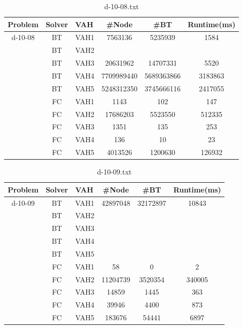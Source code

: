 \documentclass{article}
\begin{document}
\begin{table}[]
\caption{d-10-08.txt}
\label{tab:my-table}
\begin{tabular}{|c|c|c|c|c|c|}
\hline
Problem & Solver & \multicolumn{1}{l|}{VAH} & \#Node & \#BT & \multicolumn{1}{l|}{Runtime(ms)} \\ \hline
\multirow{10}{*}{d-10-08} & BT & VAH1 & 7563136 & 5235939 & 1584 \\ \cline{2-6} 
 & BT & VAH2 &  &  &  \\ \cline{2-6} 
 & BT & VAH3 & 20631962 & 14707331 & 5520 \\ \cline{2-6} 
 & BT & VAH4 & 7709989440 & 5689363866 & 3183863 \\ \cline{2-6} 
 & BT & VAH5 & 5248312350 & 3745666116 & 2417055 \\ \cline{2-6} 
 & FC & VAH1 & 1143 & 102 & 147 \\ \cline{2-6} 
 & FC & VAH2 & 17686203 & 5523550 & 512335 \\ \cline{2-6} 
 & FC & VAH3 & 1351 & 135 & 253 \\ \cline{2-6} 
 & FC & VAH4 & 136 & 10 & 23 \\ \cline{2-6} 
 & FC & VAH5 & 4013526 & 1200630 & 126932 \\ \hline
\end{tabular}
\end{table}

\begin{table}[]
\caption{d-10-09.txt}
\label{tab:my-table}
\begin{tabular}{|c|c|c|c|c|c|}
\hline
Problem & Solver & \multicolumn{1}{l|}{VAH} & \#Node & \#BT & \multicolumn{1}{l|}{Runtime(ms)} \\ \hline
\multirow{10}{*}{d-10-09} & BT & VAH1 & 42897048 & 32172897 & 10843 \\ \cline{2-6} 
 & BT & VAH2 &  &  &  \\ \cline{2-6} 
 & BT & VAH3 &  &  &  \\ \cline{2-6} 
 & BT & VAH4 &  &  &  \\ \cline{2-6} 
 & BT & VAH5 &  &  &  \\ \cline{2-6} 
 & FC & VAH1 & 58 & 0 & 2 \\ \cline{2-6} 
 & FC & VAH2 & 11204739 & 3520354 & 340005 \\ \cline{2-6} 
 & FC & VAH3 & 14859 & 1445 & 363 \\ \cline{2-6} 
 & FC & VAH4 & 39946 & 4400 & 873 \\ \cline{2-6} 
 & FC & VAH5 & 183676 & 54441 & 6897 \\ \hline
\end{tabular}
\end{table}
\end{document}
